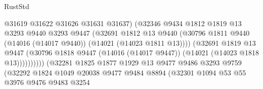 \begin{lexlean}{RustStd}
\begin{coremodule}
                                          @31619
                                          @31622
                                          @31626
                                          @31631
                                          @31637)
                                        (@32346
                                          @9434
                                          @1812
                                          @1819
                                          @13
                                          @3293
                                          @9440
                                          @3293
                                          @9447
                                          (@32691
                                            @1812
                                            @13
                                            @9440
                                            (@30796
                                              @1811
                                              @9440
                                              (@14016 (@14017 @9440))
                                              (@14021 (@14023 @1811 @13))))
                                          (@32691
                                            @1819
                                            @13
                                            @9447
                                            (@30796
                                              @1818
                                              @9447
                                              (@14016 (@14017 @9447))
                                              (@14021 (@14023 @1818 @13))))))))))
                              (@32281
                                @1825
                                @1877
                                @1929
                                @13
                                @9477
                                @9486
                                @3293
                                @9759
                                (@32292
                                  @1824
                                  @1049
                                  @20038
                                  @9477
                                  @9484
                                  @8894
                                  (@32301
                                    @1094
                                    @53
                                    @55
                                    @3976
                                    @9476
                                    @9483
                                    @3254

\end{coremodule}
\end{lexlean}
